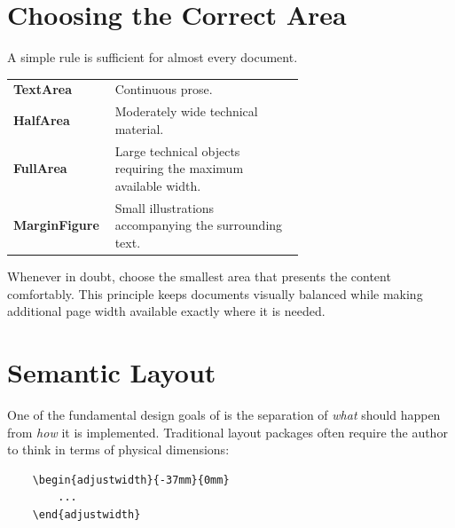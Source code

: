 \documentclass[
11pt,
a4paper,
oneside
]{scrbook}
\begin{document}

\section{Choosing the Correct Area}

A simple rule is sufficient for almost every document.
\begin{center}
	\begin{tabular}{lp{0.65\linewidth}}
		\textbf{TextArea} &
		Continuous prose.\\
		
		\textbf{HalfArea} &
		Moderately wide technical material.\\
		
		\textbf{FullArea} &
		Large technical objects requiring the maximum available width.\\
		
		\textbf{MarginFigure} &
		Small illustrations accompanying the surrounding text.
	\end{tabular}
\end{center}
Whenever in doubt, choose the smallest area that presents the content
comfortably.
This principle keeps documents visually balanced while making additional page
width available exactly where it is needed.

\section{Semantic Layout}
One of the fundamental design goals of \mdlayout{} is the separation of
\emph{what} should happen from \emph{how} it is implemented.
Traditional layout packages often require the author to think in terms of
physical dimensions:
\begin{verbatim}
	\begin{adjustwidth}{-37mm}{0mm}
		...
	\end{adjustwidth}
\end{verbatim}
\end{document}
